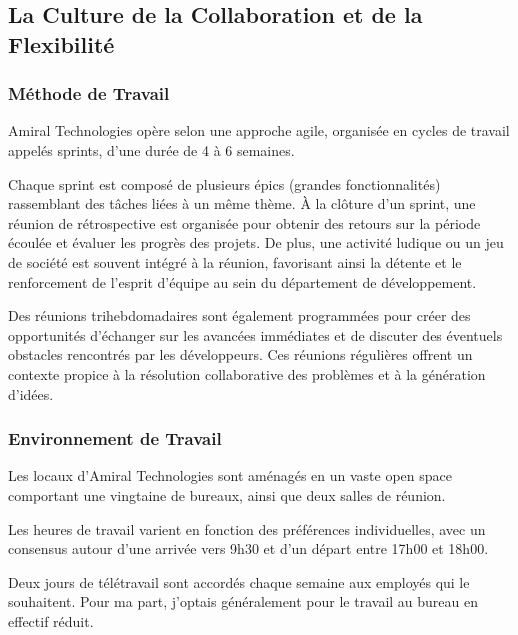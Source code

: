 \subsection*{La Culture de la Collaboration et de la Flexibilité}
\subsubsection{Méthode de Travail}
Amiral Technologies opère selon une approche agile, organisée en cycles de travail appelés sprints, d'une durée de 4 à 6 semaines.

Chaque sprint est composé de plusieurs épics (grandes fonctionnalités) rassemblant des tâches liées à un même thème.
À la clôture d'un sprint, une réunion de rétrospective est organisée pour obtenir des retours sur la période écoulée et évaluer les progrès des projets.
De plus, une activité ludique ou un jeu de société est souvent intégré à la réunion, favorisant ainsi la détente et le renforcement de l'esprit d'équipe au sein du département de développement.

Des réunions trihebdomadaires sont également programmées pour créer des opportunités d'échanger sur les avancées immédiates et de discuter des éventuels obstacles rencontrés par les développeurs.
Ces réunions régulières offrent un contexte propice à la résolution collaborative des problèmes et à la génération d'idées.

\subsubsection{Environnement de Travail}
Les locaux d'Amiral Technologies sont aménagés en un vaste open space comportant une vingtaine de bureaux, ainsi que deux salles de réunion.

Les heures de travail varient en fonction des préférences individuelles, avec un consensus autour d'une arrivée vers 9h30 et d'un départ entre 17h00 et 18h00.

Deux jours de télétravail sont accordés chaque semaine aux employés qui le souhaitent.
Pour ma part, j'optais généralement pour le travail au bureau en effectif réduit.
